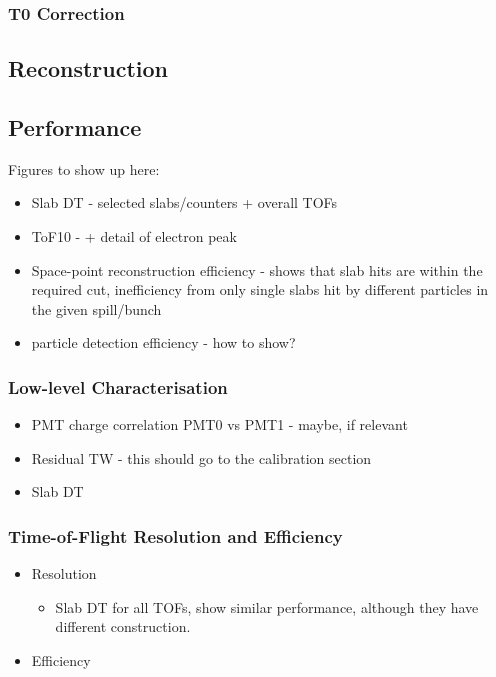 \subsubsection{T0 Correction}





\subsection{Reconstruction}


\subsection{Performance}
\label{SubSect:TOF_Performance}


{\color{red}
Figures to show up here:
\begin{itemize}
\item Slab DT - selected slabs/counters + overall TOFs
\item ToF10 - + detail of electron peak
\item Space-point reconstruction efficiency - shows that slab hits are
  within the required cut, inefficiency from only single slabs hit by
  different particles in the given spill/bunch
\item particle detection efficiency - how to show?
\end{itemize}
}

\subsubsection{Low-level Characterisation}
{\color{red}
  \begin{itemize}
  \item PMT charge correlation PMT0 vs PMT1 - maybe, if relevant
  \item Residual TW - this should go to the calibration section
  \item Slab DT
  \end{itemize}
}

\subsubsection{Time-of-Flight Resolution and Efficiency}
{\color{red}
  \begin{itemize}
  \item Resolution
    \begin{itemize}
    \item Slab DT for all TOFs, show similar performance, although
      they have different construction.
    \end{itemize}
  \item Efficiency
  \end{itemize}
}

